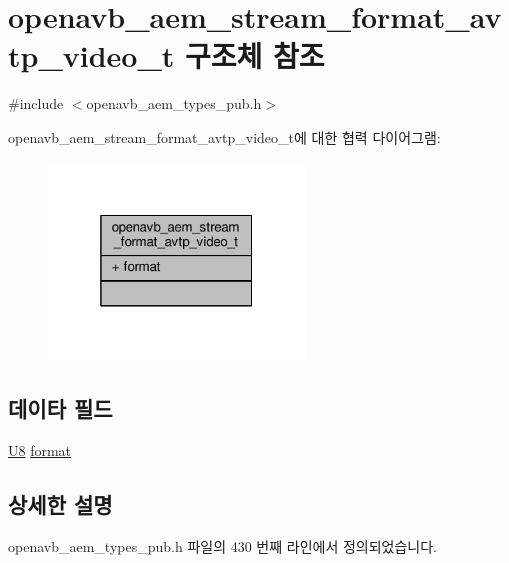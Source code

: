 \hypertarget{structopenavb__aem__stream__format__avtp__video__t}{}\section{openavb\+\_\+aem\+\_\+stream\+\_\+format\+\_\+avtp\+\_\+video\+\_\+t 구조체 참조}
\label{structopenavb__aem__stream__format__avtp__video__t}


{\ttfamily \#include $<$openavb\+\_\+aem\+\_\+types\+\_\+pub.\+h$>$}



openavb\+\_\+aem\+\_\+stream\+\_\+format\+\_\+avtp\+\_\+video\+\_\+t에 대한 협력 다이어그램\+:
\nopagebreak
\begin{figure}[H]
\begin{center}
\leavevmode
\includegraphics[width=193pt]{structopenavb__aem__stream__format__avtp__video__t__coll__graph}
\end{center}
\end{figure}
\subsection*{데이타 필드}
\begin{DoxyCompactItemize}
\item 
\hyperlink{openavb__types__base__pub_8h_aa63ef7b996d5487ce35a5a66601f3e73}{U8} \hyperlink{structopenavb__aem__stream__format__avtp__video__t_a37f3210787a8b11a8f8811f7cf167fdf}{format}
\end{DoxyCompactItemize}


\subsection{상세한 설명}


openavb\+\_\+aem\+\_\+types\+\_\+pub.\+h 파일의 430 번째 라인에서 정의되었습니다.



